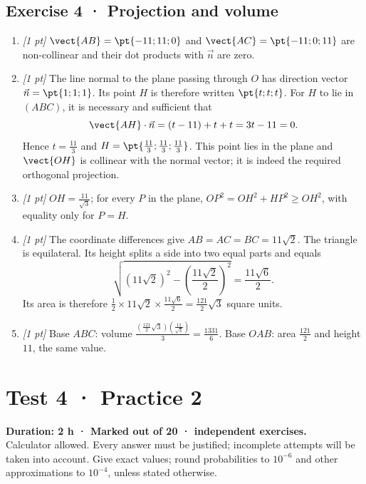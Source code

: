 \subsection*{Exercise 4 · Projection and volume}\begin{enumerate}

\item \textit{[1 pt]} $\vect{AB}=\pt{-11;11;0}$ and $\vect{AC}=\pt{-11;0;11}$ are non-collinear and their dot products with $\vec n$ are zero.

\item \textit{[1 pt]} The line normal to the plane passing through $O$ has direction vector $\vec n=\pt{1;1;1}$. Its point $H$ is therefore written $\pt{t;t;t}$. For $H$ to lie in $(ABC)$, it is necessary and sufficient that
\[\vect{AH}\cdot\vec n=(t-11)+t+t=3t-11=0.\]
Hence $t=\frac{11}{3}$ and $H=\pt{\frac{11}{3};\frac{11}{3};\frac{11}{3}}$. This point lies in the plane and $\vect{OH}$ is collinear with the normal vector; it is indeed the required orthogonal projection.

\item \textit{[1 pt]} $OH=\frac{11}{\sqrt{3}}$; for every $P$ in the plane, $OP^2=OH^2+HP^2\ge OH^2$, with equality only for $P=H$.

\item \textit{[1 pt]} The coordinate differences give $AB=AC=BC=11\sqrt2$. The triangle is equilateral. Its height splits a side into two equal parts and equals
\[\sqrt{(11\sqrt2)^2-(\frac{11\sqrt{2}}{2})^2}=\frac{11\sqrt6}{2}.\]
Its area is therefore $\frac12\times 11\sqrt2\times\frac{11\sqrt6}{2}=\frac{121}{2}\sqrt3$ square units.

\item \textit{[1 pt]} Base $ABC$: volume $\frac{(\frac{121}{2}\sqrt3)(\frac{11}{\sqrt{3}})}{3}=\frac{1331}{6}$. Base $OAB$: area $\frac{121}{2}$ and height $11$, the same value.

\end{enumerate}

\fi

\mxnewpage{}\label{sujet:6-2}

\section*{Test 4 · Practice 2}


\textbf{Duration: 2 h · Marked out of 20 ·  independent exercises.}\\Calculator allowed. Every answer must be justified; incomplete attempts will be taken into account. Give exact values; round probabilities to $10^{-6}$ and other approximations to $10^{-4}$, unless stated otherwise.

